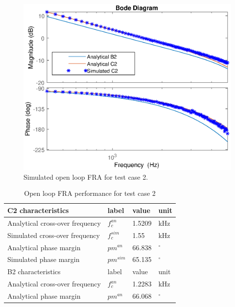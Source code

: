\documentclass[journal]{IEEEtran}
\begin{document}
\begin{figure}[t!]
    \centerline{\includegraphics[width=0.95\linewidth]{figures/tc2_olfra.eps}}
    \caption{Simulated open loop FRA  for test case 2.}
    \label{fig:tc2_olfra} 
\end{figure}

\begin{table}[h!]
			  \caption{Open loop FRA performance for test case 2}
              \label{tab:tc2_olfra}
              \centering
              \begin{tabular}{llll}
                           \midrule\midrule
        C2 characteristics & label & value   & unit\\
        \midrule               
                  Analytical cross-over frequency	& $f_{c}^{an}$ & 1.5209 &kHz\\
                  Simulated cross-over frequency	& $f_{c}^{sim}$ & 1.55 &kHz\\ 
                  Analytical phase margin  & $pm^{an}$ & 66.838 &  $^\circ$   \\
                  Simulated phase margin  & $pm^{sim}$ & 65.135 &  $^\circ$   \\
                  \midrule\midrule
                  B2 characteristics & label  & value    & unit\\
                  \midrule
                  Analytical cross-over frequency	& $f_{c}^{an}$ & 1.2283 &kHz\\
                  Analytical phase margin  & $pm^{an}$ & 66.068 &  $^\circ$   \\
                  \midrule\midrule
                                                        
              \end{tabular}
\end{table}
\end{document}
